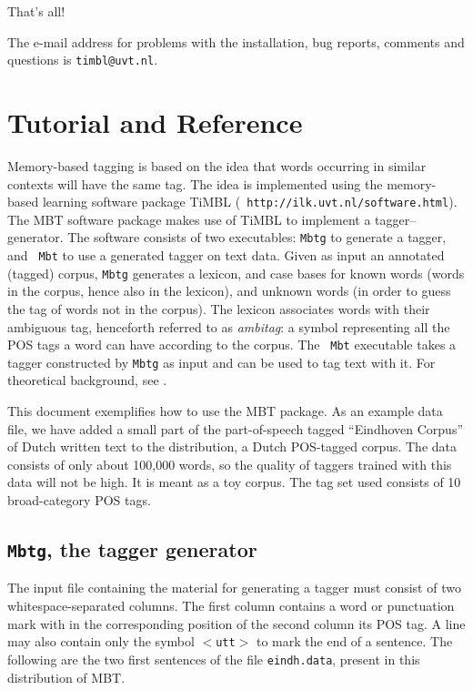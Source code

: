 \documentclass{report}
\begin{document}
That's all!

The e-mail address for problems with the installation, bug reports,
comments and questions is {\tt timbl@uvt.nl}.

\chapter{Tutorial and Reference}
\label{tutorial}

Memory-based tagging is based on the idea that words occurring in
similar contexts will have the same tag. The idea is implemented using
the memory-based learning software package TiMBL ({\tt
  http://ilk.uvt.nl/software.html}).  The MBT software package
makes use of TiMBL to implement a tagger--generator.  The software
consists of two executables: {\tt Mbtg} to generate a tagger, and {\tt
  Mbt} to use a generated tagger on text data.  Given as input an
annotated (tagged) corpus, {\tt Mbtg} generates a lexicon, and case
bases for known words (words in the corpus, hence also in the
lexicon), and unknown words (in order to guess the tag of words
not in the corpus). The lexicon associates words with their ambiguous
tag, henceforth referred to as {\em ambitag}: a symbol representing
all the POS tags a word can have according to the corpus. The {\tt
  Mbt} executable takes a tagger constructed by {\tt Mbtg} as input
and can be used to tag text with it.  For theoretical background, see
\cite{Daelemans+96,Zavrel+99}.

This document exemplifies how to use the MBT package. As an example
data file, we have added a small part of the part-of-speech tagged
``Eindhoven Corpus'' of Dutch written text \cite{Uitdenboogaard75} to
the distribution, a Dutch POS-tagged corpus. The data consists of only
about 100,000 words, so the quality of taggers trained with this data
will not be high. It is meant as a toy corpus. The tag set used
consists of 10 broad-category POS tags.

\section{{\tt Mbtg}, the tagger generator}

The input file containing the material for generating a tagger must
consist of two whitespace-separated columns. The first column contains
a word or punctuation mark with in the corresponding position of the
second column its POS tag. A line may also contain only the symbol
{\tt $<$utt$>$} to mark the end of a sentence. The following are the two first
sentences of the file {\tt eindh.data}, present in this distribution
of MBT.
\end{document}
